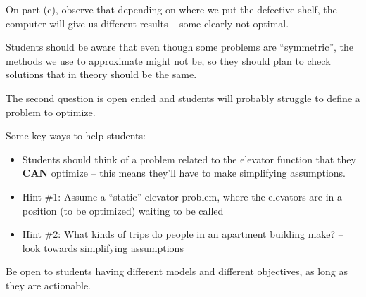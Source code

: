 On part (c), observe that depending on where we put the defective shelf, the computer will give us different results -- some clearly not optimal. 

Students should be aware that even though some problems are ``symmetric'', the methods we use to approximate might not be, so they should plan to check solutions that in theory should be the same.


\hfill 

The second question is open ended and students will probably struggle to define a problem to optimize.

Some key ways to help students:
\begin{itemize}
	\item Students should think of a problem related to the elevator function that they \textbf{CAN} optimize -- this means they'll have to make simplifying assumptions.
	\item Hint \#1: Assume a ``static'' elevator problem, where the elevators are in a position (to be optimized) waiting to be called
	\item Hint \#2: What kinds of trips do people in an apartment building make? -- look towards simplifying assumptions
\end{itemize}

Be open to students having different models and different objectives, as long as they are actionable.

	


%
	
	

	
	
